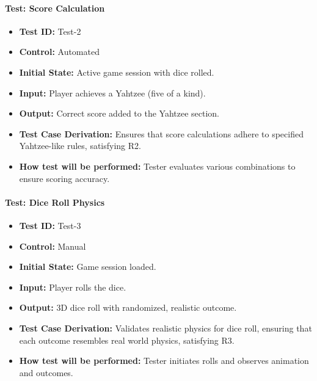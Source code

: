 \documentclass[12pt, titlepage]{article}
\begin{document}
\paragraph{Test: Score Calculation}
\begin{itemize}
    \item \textbf{Test ID:} Test-2
    \item \textbf{Control:} Automated
    \item \textbf{Initial State:} Active game session with dice rolled.
    \item \textbf{Input:} Player achieves a Yahtzee (five of a kind).
    \item \textbf{Output:} Correct score added to the Yahtzee section.
    \item \textbf{Test Case Derivation:} Ensures that score calculations adhere to specified Yahtzee-like rules, satisfying R2.
    \item \textbf{How test will be performed:} Tester evaluates various combinations to ensure scoring accuracy.
\end{itemize}

\paragraph{Test: Dice Roll Physics}
\begin{itemize}
    \item \textbf{Test ID:} Test-3
    \item \textbf{Control:} Manual
    \item \textbf{Initial State:} Game session loaded.
    \item \textbf{Input:} Player rolls the dice.
    \item \textbf{Output:} 3D dice roll with randomized, realistic outcome.
    \item \textbf{Test Case Derivation:} Validates realistic physics for dice roll, ensuring that each outcome resembles real world physics, satisfying R3.
    \item \textbf{How test will be performed:} Tester initiates rolls and observes animation and outcomes.
\end{itemize}
\end{document}
